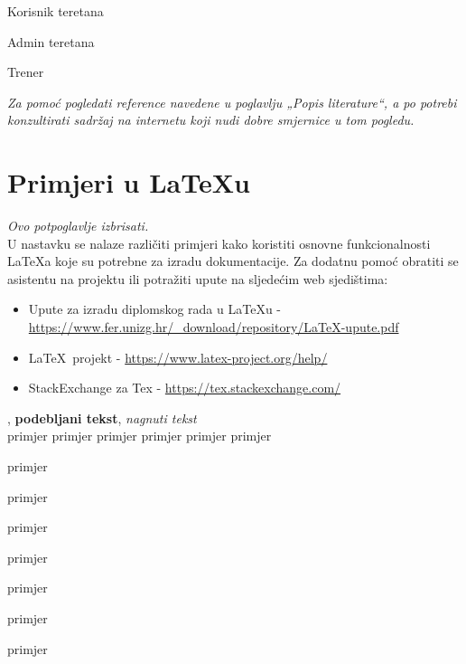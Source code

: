 		\begin{packed_item}
			\item Korisnik teretana
			\item Admin teretana
			\item Trener
		\end{packed_item}
	
		
	
			
		\textit{Za pomoć pogledati reference navedene u poglavlju „Popis literature“, a po potrebi konzultirati sadržaj na internetu koji nudi dobre smjernice u tom pogledu.}
		\eject
		
		\section{Primjeri u \LaTeX u}
		
		\textit{Ovo potpoglavlje izbrisati.}\\

		U nastavku se nalaze različiti primjeri kako koristiti osnovne funkcionalnosti \LaTeX a koje su potrebne za izradu dokumentacije. Za dodatnu pomoć obratiti se asistentu na projektu ili potražiti upute na sljedećim web sjedištima:
		\begin{itemize}
			\item Upute za izradu diplomskog rada u \LaTeX u - \url{https://www.fer.unizg.hr/_download/repository/LaTeX-upute.pdf}
			\item \LaTeX\ projekt - \url{https://www.latex-project.org/help/}
			\item StackExchange za Tex - \url{https://tex.stackexchange.com/}\\
		
		\end{itemize} 	


		
		\noindent {}, \textbf{podebljani tekst}, 	\textit{nagnuti tekst}\\
		\noindent \normalsize primjer \large primjer \Large primjer \LARGE {primjer} \huge {primjer} \Huge primjer \normalsize
				
		\begin{packed_item}
			
			\item  primjer
			\item  primjer
			\item  primjer
			\item[] \begin{packed_enum}
				\item primjer
				\item[] \begin{packed_enum}
					\item[1.a] primjer
					\item[b] primjer
				\end{packed_enum}
				\item primjer
			\end{packed_enum}
			
		\end{packed_item}
		
